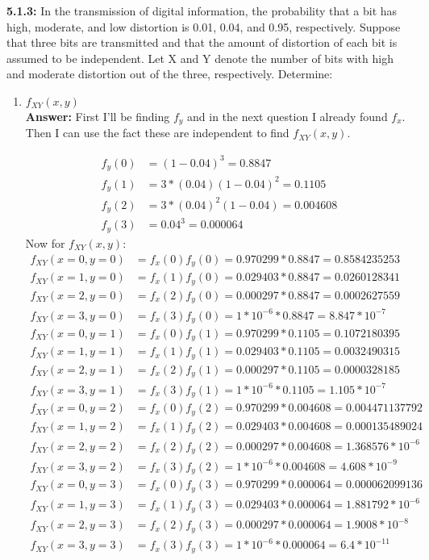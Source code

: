 \documentclass[11pt]{article}
\begin{document}
\noindent\textbf{5.1.3:} In the transmission of digital information, the probability that a bit has high, moderate, and low distortion is 0.01, 0.04, and 0.95, respectively. Suppose that three bits are transmitted and that the amount of distortion of each bit is assumed to be independent. Let X and Y denote the number of bits with high and moderate distortion out of the three, respectively. Determine:
\begin{enumerate}
\item $f_{XY}(x,y)$
\\\textbf{Answer:} First I'll be finding $f_y$ and in the next question I already found $f_x$. Then I can use the fact these are independent to find $f_{XY}(x,y)$.

\begin{equation}
\begin{split}
f_y(0) &= (1-0.04)^3 = 0.8847\\
f_y(1) & = 3*(0.04)(1-0.04)^2 = 0.1105\\
f_y(2) & = 3*(0.04)^2(1-0.04) = 0.004608\\
f_y(3) & = 0.04^3 = 0.000064
\end{split}
\end{equation}
Now for $f_{XY}(x,y)$:
\begin{equation}
\begin{split}
f_{XY}(x=0,y=0) &= f_x(0)f_y(0) = 0.970299*0.8847=0.8584235253\\
f_{XY}(x=1,y=0) &= f_x(1)f_y(0) = 0.029403*0.8847=0.0260128341\\
f_{XY}(x=2,y=0) &= f_x(2)f_y(0) = 0.000297*0.8847=0.0002627559\\
f_{XY}(x=3,y=0) &= f_x(3)f_y(0) = 1*10^{-6}*0.8847=8.847*10^{-7}\\
f_{XY}(x=0,y=1) &= f_x(0)f_y(1) = 0.970299*0.1105=0.1072180395\\
f_{XY}(x=1,y=1) &= f_x(1)f_y(1) = 0.029403*0.1105=0.0032490315\\
f_{XY}(x=2,y=1) &= f_x(2)f_y(1) = 0.000297*0.1105=0.0000328185\\
f_{XY}(x=3,y=1) &= f_x(3)f_y(1) = 1*10^{-6}*0.1105=1.105*10^{-7}\\
f_{XY}(x=0,y=2) &= f_x(0)f_y(2) = 0.970299*0.004608=0.004471137792\\
f_{XY}(x=1,y=2) &= f_x(1)f_y(2) = 0.029403*0.004608=0.000135489024\\
f_{XY}(x=2,y=2) &= f_x(2)f_y(2) = 0.000297*0.004608=1.368576*10^{-6}\\
f_{XY}(x=3,y=2) &= f_x(3)f_y(2) = 1*10^{-6}*0.004608=4.608*10^{-9}\\
f_{XY}(x=0,y=3) &= f_x(0)f_y(3) = 0.970299*0.000064=0.000062099136\\
f_{XY}(x=1,y=3) &= f_x(1)f_y(3) = 0.029403*0.000064=1.881792*10^{-6}\\
f_{XY}(x=2,y=3) &= f_x(2)f_y(3) = 0.000297*0.000064=1.9008*10^{-8}\\
f_{XY}(x=3,y=3) &= f_x(3)f_y(3) = 1*10^{-6}*0.000064=6.4*10^{-11}
\end{split}
\end{equation}


\end{enumerate}
\end{document}
